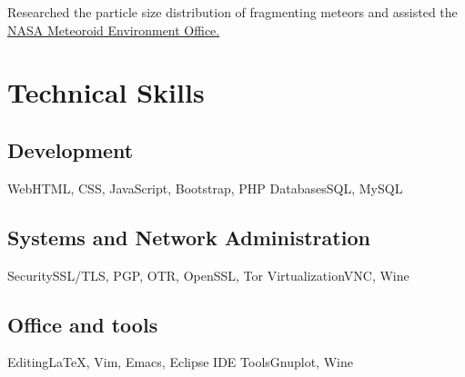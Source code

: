 \documentclass[11pt,a4paper]{moderncv}
\begin{document}
{Researched the particle size distribution of fragmenting meteors and assisted
the \href{https://www.nasa.gov/offices/meo/home/index.html}{NASA Meteoroid
Environment Office.}}


\section{Technical Skills}

\subsection{Development}
{Web}{HTML, CSS, JavaScript, Bootstrap, PHP}
{Databases}{SQL, MySQL}

\subsection{Systems and Network Administration}
{Security}{SSL/TLS, PGP, OTR, OpenSSL, Tor}
{Virtualization}{VNC, Wine}

\subsection{Office and tools}
{Editing}{\LaTeX, Vim, Emacs, Eclipse IDE}
{Tools}{Gnuplot, Wine}



\end{document}

